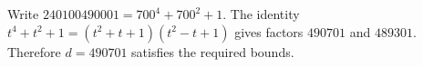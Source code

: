 Write $240100490001=700^4+700^2+1$. The identity $t^4+t^2+1=(t^2+t+1)(t^2-t+1)$ gives factors $490701$ and $489301$. Therefore $\boxed{d=490701}$ satisfies the required bounds.
